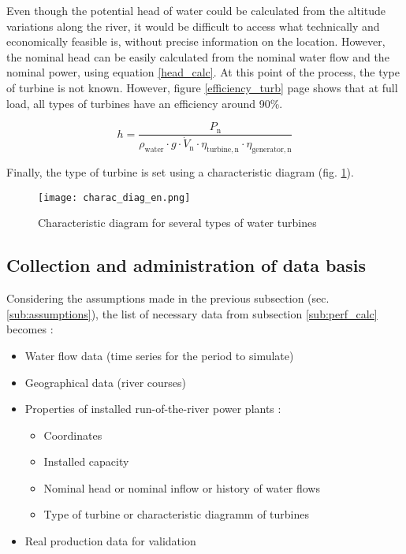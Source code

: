 Even though the potential head of water could be calculated from the altitude variations along the river, it would be difficult to access what technically and economically feasible is, without precise information on the location. However, the nominal head can be easily calculated from the nominal water flow and the nominal power, using equation \ref{head_calc}. At this point of the process, the type of turbine is not known. However, figure \ref{efficiency_turb} page \pageref{efficiency_turb} shows that at full load, all types of turbines have an efficiency around 90\%.

\begin{equation}
\label{head_calc} 
 h = \frac{P_\mathrm{n}}{\rho_\mathrm{water} \cdot g \cdot \dot{V}_\mathrm{n} \cdot \eta_\mathrm{turbine,n} \cdot \eta_\mathrm{generator,n}}
\end{equation}

Finally, the type of turbine is set using a characteristic diagram (fig. \ref{charac_diag}). 

\begin{figure}[H]
\texttt{[image: charac\_diag\_en.png]}
\caption[Characteristic diagram for several types of water turbines]{Characteristic diagram for several types of water turbines \cite{wiki_WK}}
\centering
\label{charac_diag}
\end{figure}

\subsection{Collection and administration of data basis}
\label{sub:collec_data}

Considering the assumptions made in the previous subsection (sec. \ref{sub:assumptions}), the list of necessary data from subsection \ref{sub:perf_calc} becomes :
\begin{itemize}
 \item Water flow data (time series for the period to simulate)
 \item Geographical data (river courses)
 \item Properties of installed run-of-the-river power plants :
 \begin{itemize}
  \item Coordinates
  \item Installed capacity
  \item Nominal head or nominal inflow or history of water flows
  \item Type of turbine or characteristic diagramm of turbines
 \end{itemize}
 \item Real production data for validation
\end{itemize}

